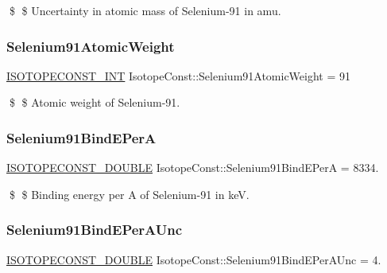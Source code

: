 \$ \$ Uncertainty in atomic mass of Selenium-\/91 in amu. \mbox{\label{group___isotope_const-_selenium-_se91_ga69bd38b199e502b53de687e605c9f7b4}} 
\subsubsection{\texorpdfstring{Selenium91\+Atomic\+Weight}{Selenium91AtomicWeight}}
{\footnotesize\ttfamily \mbox{\hyperlink{group___isotope_const-_macros_ga5f18360b3e99483a35c32d789e62621c}{I\+S\+O\+T\+O\+P\+E\+C\+O\+N\+S\+T\+\_\+\+I\+NT}} Isotope\+Const\+::\+Selenium91\+Atomic\+Weight = 91}

\$ \$ Atomic weight of Selenium-\/91. \mbox{\label{group___isotope_const-_selenium-_se91_gad886341e2158619b760d48f70bd87784}} 
\subsubsection{\texorpdfstring{Selenium91\+Bind\+E\+PerA}{Selenium91BindEPerA}}
{\footnotesize\ttfamily \mbox{\hyperlink{group___isotope_const-_macros_ga8f45a7272ce02c0b4c65c44636ed719a}{I\+S\+O\+T\+O\+P\+E\+C\+O\+N\+S\+T\+\_\+\+D\+O\+U\+B\+LE}} Isotope\+Const\+::\+Selenium91\+Bind\+E\+PerA = 8334.}

\$ \$ Binding energy per A of Selenium-\/91 in keV. \mbox{\label{group___isotope_const-_selenium-_se91_ga82c29bc6dbc2bac17c04bc0f7c26ff8a}} 
\subsubsection{\texorpdfstring{Selenium91\+Bind\+E\+Per\+A\+Unc}{Selenium91BindEPerAUnc}}
{\footnotesize\ttfamily \mbox{\hyperlink{group___isotope_const-_macros_ga8f45a7272ce02c0b4c65c44636ed719a}{I\+S\+O\+T\+O\+P\+E\+C\+O\+N\+S\+T\+\_\+\+D\+O\+U\+B\+LE}} Isotope\+Const\+::\+Selenium91\+Bind\+E\+Per\+A\+Unc = 4.}

